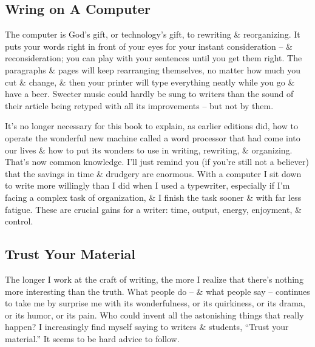 \documentclass{article}
\begin{document}
\subsection{Wring on A Computer}
The computer is God's gift, or technology's gift, to rewriting \& reorganizing. It puts your words right in front of your eyes for your instant consideration -- \& reconsideration; you can play with your sentences until you get them right. The paragraphs \& pages will keep rearranging themselves, no matter how much you cut \& change, \& then your printer will type everything neatly while you go \& have a beer. Sweeter music could hardly be sung to writers than the sound of their article being retyped with all its improvements -- but not by them.

It's no longer necessary for this book to explain, as earlier editions did, how to operate the wonderful new machine called a word processor that had come into our lives \& how to put its wonders to use in writing, rewriting, \& organizing. That's now common knowledge. I'll just remind you (if you're still not a believer) that the savings in time \& drudgery are enormous. With a computer I sit down to write more willingly than I did when I used a typewriter, especially if I'm facing a complex task of organization, \& I finish the task sooner \& with far less fatigue. These are crucial gains for a writer: time, output, energy, enjoyment, \& control.

\subsection{Trust Your Material}
The longer I work at the craft of writing, the more I realize that there's nothing more interesting than the truth. What people do -- \& what people say -- continues to take me by surprise me with its wonderfulness, or its quirkiness, or its drama, or its humor, or its pain. Who could invent all the astonishing things that really happen? I increasingly find myself saying to writers \& students, ``Trust your material.'' It seems to be hard advice to follow.
\end{document}

